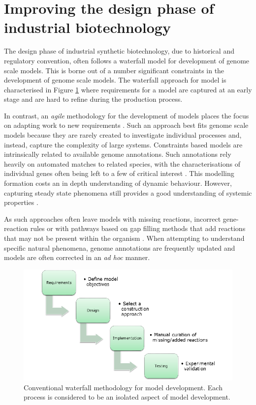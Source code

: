 \documentclass[a4paper,10pt]{article}
\begin{document}
\section{Improving the design phase of industrial biotechnology}

The design phase of industrial synthetic biotechnology, due to historical and regulatory convention, often follows a waterfall model for development of genome scale models.
This is borne out of a number significant constraints in the development of genome scale models.
The waterfall approach for model is characterised in Figure \ref{fig:methodology_approaches} where requirements for a model are captured at an early stage and are hard to refine during the production process.

In contrast, an \textit{agile} methodology for the development of models places the focus on adapting work to new requirements \cite{martin2002agile}.
Such an approach best fits genome scale models because they are rarely created to investigate individual processes and, instead, capture the complexity of large systems.
Constraints based models are intrinsically related to available genome annotations.
Such annotations rely heavily on automated matches to related species, with the characterisations of individual genes often being left to a few of critical interest \cite{seemann2014prokka}.
This modelling formation costs an in depth understanding of dynamic behaviour. 
However, capturing steady state phenomena still provides a good understanding of systemic properties \cite{o2015using}.

As such approaches often leave models with missing reactions, incorrect gene-reaction rules \cite{thiele2010protocol} or with pathways based on gap filling methods that add reactions that may not be present within the organism \cite{benedict2014likelihood}.
When attempting to understand specific natural phenomena, genome annotations are frequently updated and models are often corrected in an \textit{ad hoc} manner.

\begin{figure}[ht]
\includegraphics[width=\textwidth]{Waterfall.png}
\caption{Conventional waterfall methodology for model development.
Each process is considered to be an isolated aspect of model development.}
\label{fig:methodology_approaches}
\end{figure}
\end{document}
